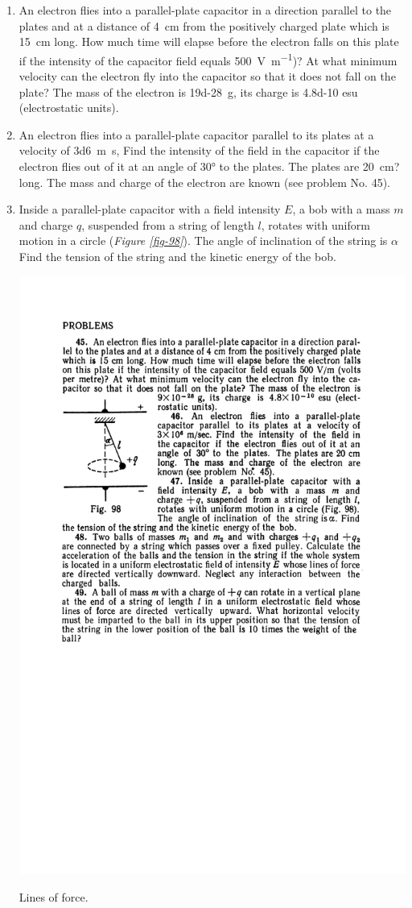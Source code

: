 \documentclass[a4paper,sfsidenotes]{tufte-book}
\begin{document}
\begin{enumerate}[resume=problems]
\item An electron flies into a parallel-plate capacitor in a direction parallel to the plates and at a distance of \SI{4}{\centi\metre} from the positively charged plate which is \SI{15}{\centi\metre} long. How much time will elapse before the electron falls on this plate if the intensity of the capacitor field equals \SI[per-mode=symbol]{500}{\volt\per\metre})? At what minimum velocity can the electron fly into the capacitor so that it does not fall on the plate? The mass of the electron is \SI{19d-28}{\gram}, its charge is \num{4.8d-10} esu (electrostatic units).
\item An electron flies into a parallel-plate capacitor parallel to its plates at a velocity of \SI[per-mode=symbol]{3d6}{\metre\second}, Find the intensity of the field in the capacitor if the electron flies out of it at an angle of \ang{30} to the plates. The plates are \SI{20}{\centi\metre}? long. The mass and charge of the electron are known (see problem No. 45).
\item Inside a parallel-plate capacitor with a field intensity $E$, a bob with a mass $m$ and charge $q$, suspended from a string of length $l$, rotates with uniform motion in a circle (\emph{Figure \ref{fig-98}}). The angle of inclination of the string is $\alpha$ Find the tension of the string and the kinetic energy of the bob. 
\begin{marginfigure}%
\centering
\includegraphics[width=.8\linewidth]{fig-098a}
\caption{Lines of force.}
\label{fig-98}
\end{marginfigure}


\end{enumerate}
\end{document}
